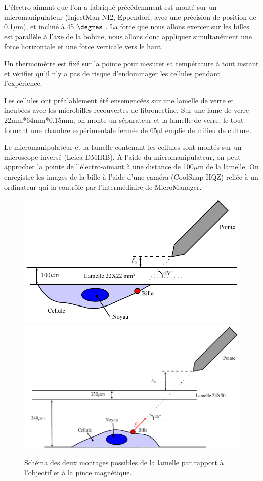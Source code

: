 \documentclass{report}
\newcommand{\micro}{$\mathrm{\mu}$}
\begin{document}
		 L'électro-aimant que l'on a fabriqué précédemment est monté sur un micromanipulateur (InjectMan NI2, Eppendorf, avec une précision de position de 0.1$\mu$m), et incliné à 45 $\degres$ . La force que nous allons exercer sur les billes est parallèle à l'axe de la bobine, nous allons donc appliquer simultanément une force horizontale et une force verticale vers le haut. 
		 
		 Un thermomètre est fixé sur la pointe pour mesurer sa température à tout instant et vérifier qu'il n'y a pas de risque d'endommager les cellules pendant l'expérience. 
		 
		 Les cellules ont préalablement été ensemencées sur une lamelle de verre et incubées avec les microbilles recouvertes de fibronectine. Sur une lame de verre 22mm*64mm*0.15mm, on monte un séparateur et la lamelle de verre, le tout formant une chambre expérimentale fermée de 65\micro l emplie de milieu de culture. 		 
		 
		 Le micromanipulateur et la lamelle contenant les cellules sont montés sur un microscope inversé (Leica DMIRB). \`A l'aide du micromanipulateur, on peut approcher la pointe de l'électro-aimant à une distance de 100$\mu$m de la lamelle. On enregistre les images de la bille à l'aide d'une caméra (CoolSnap HQZ) reliée à un ordinateur qui la contrôle par l'intermédiaire de MicroManager. 
		 
		 \begin{figure}
		 \includegraphics[scale=0.5]{modeop1.pdf}
		 \includegraphics[scale=0.5]{modeop2.pdf}
		 \caption{Schéma des deux montages possibles de la lamelle par rapport à l'objectif et à la pince magnétique.}
		 \end{figure}
		 
\end{document}
